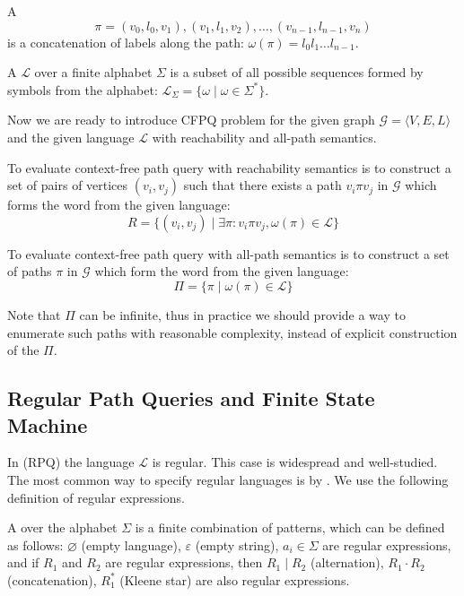 \begin{definition}
A  $$\pi = (v_0,l_0,v_1),(v_1,l_1,v_2),\ldots,(v_{n-1},l_{n-1},v_n)$$ is a concatenation of labels along the path: $\omega(\pi) = l_0 l_1 \ldots l_{n-1}$.
\end{definition}

\begin{definition}
A  $\mathcal{L}$ over a finite alphabet $\Sigma$ is a subset of all possible sequences formed by symbols from the alphabet: $\mathcal{L}_{\Sigma} = \{\omega \mid \omega \in \Sigma^*\}$.
\end{definition}

Now we are ready to introduce CFPQ problem for the given graph  $\mathcal{G} = \langle V,E,L \rangle$ and the given language $\mathcal{L}$ with reachability and all-path semantics.

\begin{definition}
To evaluate context-free path query with reachability semantics is to construct a set of pairs of vertices $(v_i,v_j)$ such that there exists a path $v_i \pi v_j$ in $\mathcal{G}$ which forms the word from the given language:
$$
R = \{(v_i,v_j) \mid \exists \pi: v_i \pi v_j, \omega(\pi) \in \mathcal{L} \}
$$
\end{definition}

\begin{definition}
To evaluate context-free path query with all-path semantics is to construct a set of paths $\pi$ in $\mathcal{G}$ which form the word from the given language:
$$
\Pi = \{ \pi \mid \omega(\pi) \in \mathcal{L}\}
$$
\end{definition}

Note that $\Pi$ can be infinite, thus in practice we should provide a way to enumerate such paths with reasonable complexity, instead of explicit construction of the $\Pi$.

\subsection{Regular Path Queries and Finite State Machine}

In  (RPQ) the language $\mathcal{L}$ is regular.
This case is widespread and well-studied.
The most common way to specify regular languages is by .
We use the following definition of regular expressions.
\begin{definition}
A  over the alphabet $\Sigma$ is a finite combination of patterns, which can be defined as follows: $\varnothing$ (empty language), $\varepsilon$ (empty string), $a_i \in \Sigma$ are regular expressions, and if $R_1$ and $R_2$ are regular expressions, then $R_1 \mid R_2$ (alternation), $R_1 \cdot R_2$ (concatenation), $R_1^*$ (Kleene star) are also regular expressions.
\end{definition}

